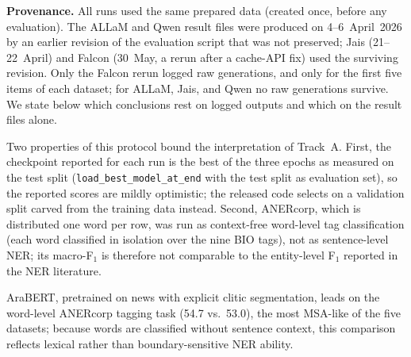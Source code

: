 \textbf{Provenance.} All runs used the same prepared data (created once, before any
evaluation). The ALLaM and Qwen result files were produced on 4--6~April~2026 by an
earlier revision of the evaluation script that was not preserved; Jais (21--22~April)
and Falcon (30~May, a rerun after a cache-API fix) used the surviving revision. Only the
Falcon rerun logged raw generations, and only for the first five items of each dataset;
for ALLaM, Jais, and Qwen no raw generations survive. We state below which conclusions
rest on logged outputs and which on the result files alone.

Two properties of this protocol bound the interpretation of Track~A. First, the
checkpoint reported for each run is the best of the three epochs as measured on the
test split (\texttt{load\_best\_model\_at\_end} with the test split as evaluation set),
so the reported scores are mildly optimistic; the released code selects on a
validation split carved from the training data instead. Second, ANERcorp, which is
distributed one word per row, was run as context-free word-level tag classification
(each word classified in isolation over the nine BIO tags), not as sentence-level NER;
its macro-F$_1$ is therefore not comparable to the entity-level F$_1$ reported in the
NER literature.

AraBERT, pretrained on news with explicit clitic segmentation, leads on the word-level
ANERcorp tagging task (54.7 vs.\ 53.0), the most MSA-like of the five datasets; because
words are classified without sentence context, this comparison reflects lexical rather
than boundary-sensitive NER ability.

